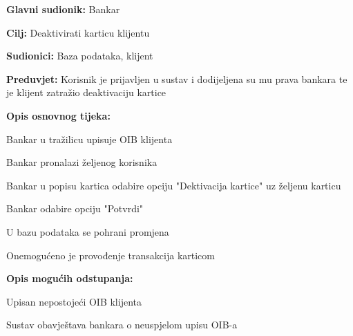                 
                \noindent {}
                \begin{packed_item}
                	
                	\item \textbf{Glavni sudionik: }Bankar
                	\item  \textbf{Cilj:} Deaktivirati karticu klijentu
                	\item  \textbf{Sudionici:} Baza podataka, klijent
                	\item  \textbf{Preduvjet:} Korisnik je prijavljen u sustav i dodijeljena su mu prava bankara te je klijent zatražio deaktivaciju kartice
                	\item  \textbf{Opis osnovnog tijeka:}
                	
                	\item[] \begin{packed_enum}
                		
                		\item Bankar u tražilicu upisuje OIB klijenta
                		\item Bankar pronalazi željenog korisnika
                		\item Bankar u popisu kartica odabire opciju "Dektivacija kartice" uz željenu karticu
                		\item Bankar odabire opciju "Potvrdi"
                		\item U bazu podataka se pohrani promjena 
                		\item Onemogućeno je provođenje transakcija karticom
                	\end{packed_enum}
                	
                	\item  \textbf{Opis mogućih odstupanja:} 
                	
                	\item[] \begin{packed_item}
                		
                		\item[1.a] Upisan nepostojeći OIB klijenta
                		\item[] \begin{packed_enum}
                			
                			\item Sustav obavještava bankara o neuspjelom upisu OIB-a
                			
                		\end{packed_enum}
                		
                	\end{packed_item}
                \end{packed_item}
                
